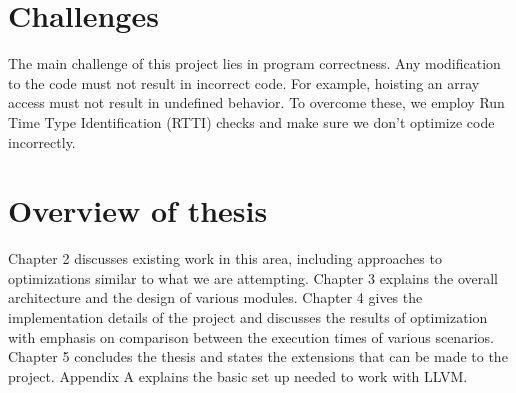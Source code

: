\section{Challenges}

The main challenge of this project lies in program correctness. Any modification to the code must not result in incorrect code. For example, hoisting an array access must not result in undefined behavior. To overcome these, we employ Run Time Type Identification (RTTI) checks and make sure we don't optimize code incorrectly.

\section{Overview of thesis}
Chapter 2 discusses existing work in this area, including approaches to optimizations similar to what we are attempting. Chapter 3 explains the overall architecture and the design of various modules. Chapter 4 gives the implementation details of the project and discusses the results of optimization with emphasis on comparison between the execution times of various scenarios. Chapter 5 concludes the thesis and states the extensions that can be made to the project. Appendix A explains the basic set up needed to work with LLVM.
